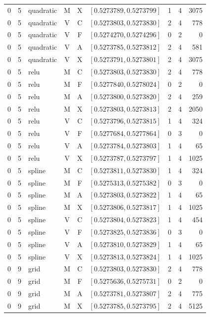 \begin{longtable}{r r l c c l r r r}
0 & 5 & quadratic & M & X & $[0.5273789,0.5273799]$ & 1 & 4 & 3075 \\
0 & 5 & quadratic & V & C & $[0.5273803,0.5273830]$ & 2 & 4 & 778 \\
0 & 5 & quadratic & V & F & $[0.5274270,0.5274296]$ & 0 & 2 & 0 \\
0 & 5 & quadratic & V & A & $[0.5273785,0.5273812]$ & 2 & 4 & 581 \\
0 & 5 & quadratic & V & X & $[0.5273791,0.5273801]$ & 2 & 4 & 3075 \\
0 & 5 & relu & M & C & $[0.5273803,0.5273830]$ & 2 & 4 & 778 \\
0 & 5 & relu & M & F & $[0.5277840,0.5278024]$ & 0 & 2 & 0 \\
0 & 5 & relu & M & A & $[0.5273800,0.5273820]$ & 2 & 4 & 259 \\
0 & 5 & relu & M & X & $[0.5273803,0.5273813]$ & 2 & 4 & 2050 \\
0 & 5 & relu & V & C & $[0.5273796,0.5273815]$ & 1 & 4 & 324 \\
0 & 5 & relu & V & F & $[0.5277684,0.5277864]$ & 0 & 3 & 0 \\
0 & 5 & relu & V & A & $[0.5273784,0.5273803]$ & 1 & 4 & 65 \\
0 & 5 & relu & V & X & $[0.5273787,0.5273797]$ & 1 & 4 & 1025 \\
0 & 5 & spline & M & C & $[0.5273811,0.5273830]$ & 1 & 4 & 324 \\
0 & 5 & spline & M & F & $[0.5275313,0.5275382]$ & 0 & 3 & 0 \\
0 & 5 & spline & M & A & $[0.5273803,0.5273822]$ & 1 & 4 & 65 \\
0 & 5 & spline & M & X & $[0.5273806,0.5273817]$ & 1 & 4 & 1025 \\
0 & 5 & spline & V & C & $[0.5273804,0.5273823]$ & 1 & 4 & 454 \\
0 & 5 & spline & V & F & $[0.5273825,0.5273836]$ & 0 & 3 & 0 \\
0 & 5 & spline & V & A & $[0.5273810,0.5273829]$ & 1 & 4 & 65 \\
0 & 5 & spline & V & X & $[0.5273813,0.5273824]$ & 1 & 4 & 1025 \\
0 & 9 & grid & M & C & $[0.5273803,0.5273830]$ & 2 & 4 & 778 \\
0 & 9 & grid & M & F & $[0.5275636,0.5275731]$ & 0 & 2 & 0 \\
0 & 9 & grid & M & A & $[0.5273781,0.5273807]$ & 2 & 4 & 775 \\
0 & 9 & grid & M & X & $[0.5273785,0.5273795]$ & 2 & 4 & 5125 \\

\end{longtable}
